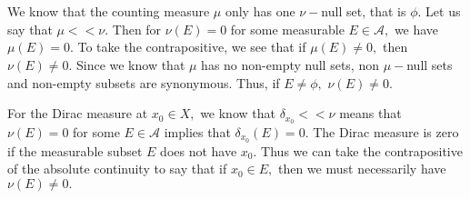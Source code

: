 \documentclass{article}
\begin{document}
\section{} %
We know that the counting measure $\mu$ only has one $\nu-$null set, that is $\phi.$ Let us say that $\mu << \nu.$ Then for $\nu(E)=0$ for some measurable 
$E \in \mathcal{A},$ we have $\mu(E)=0.$ To take the contrapositive, we see that if $\mu(E)\neq 0,$ then $\nu(E) \neq 0.$ Since we know that $\mu$ has no 
non-empty null sets, non $\mu-$null sets and non-empty subsets are synonymous. Thus, if $E \neq \phi,$ $\nu(E) \neq 0.$

For the Dirac measure at $x_0 \in X,$ we know that $\delta_{x_0} << \nu$ means that $\nu(E)=0$ for some $E \in \mathcal{A}$ implies that 
$\delta_{x_0}(E)=0.$ The Dirac measure is zero if the measurable subset $E$ does not have $x_0.$ Thus we can take the contrapositive of the absolute 
continuity to say that if $x_0 \in E,$ then we must necessarily have $\nu(E)\neq 0.$ 
\end{document}
